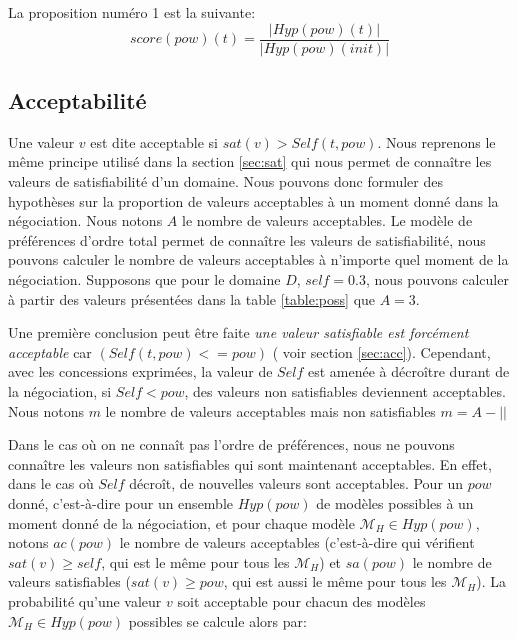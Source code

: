 \documentclass{llncs}
\begin{document}
	La proposition numéro 1 est la suivante:
	$$score(pow)(t) = \frac{|Hyp(pow)(t)|}{|Hyp(pow)(init)|}$$
	
	\subsection{Acceptabilité}
	
	Une valeur $v$ est dite acceptable si $sat(v) > Self(t, pow)$. Nous reprenons le même principe utilisé dans la section \ref{sec:sat} qui nous permet de connaître les valeurs de satisfiabilité d'un domaine. Nous pouvons donc formuler des hypothèses sur la proportion de valeurs acceptables à un moment donné dans la négociation. Nous notons $A$ le nombre de valeurs acceptables. Le modèle de préférences d'ordre total permet de connaître les valeurs de satisfiabilité, nous pouvons calculer le nombre de valeurs acceptables à n'importe quel moment de la négociation. Supposons que pour le domaine $D$, $self =0.3$, nous pouvons calculer à partir des valeurs présentées dans la table \ref{table:poss} que $A =3$. 
	
	
	Une première conclusion peut être faite \emph{une valeur \textit{satisfiable} est forcément \textit{acceptable}} car $(Self(t,pow) <= pow)$ ( voir section \ref{sec:acc}). Cependant, avec les concessions exprimées, la valeur de $Self$ est amenée à décroître durant de la négociation, si $Self<pow$, des valeurs non satisfiables deviennent acceptables. Nous notons $m$ le nombre de valeurs acceptables mais non satisfiables $ m= A - ||$

	Dans le cas où on ne connaît pas l'ordre de préférences, nous ne pouvons connaître les valeurs non satisfiables qui sont maintenant acceptables. En effet, dans le cas où $Self$ décroît, de nouvelles valeurs sont acceptables. Pour un $pow$ donné, c'est-à-dire pour un ensemble $Hyp(pow)$ de modèles possibles à un moment donné de la négociation, et pour chaque modèle $\mathcal{M}_H\in Hyp(pow)$, notons $ac(pow)$ le nombre de valeurs acceptables (c'est-à-dire qui vérifient $sat(v)\geq self$, qui est le même pour tous les $\mathcal{M}_H$) et $sa(pow)$ le nombre de valeurs satisfiables ($sat(v)\geq pow$, qui est aussi le même pour tous les $\mathcal{M}_H$). La probabilité qu'une valeur $v$ soit acceptable pour chacun des modèles $\mathcal{M}_H\in Hyp(pow)$ possibles se calcule alors par:
	
	
	
	
\end{document}
